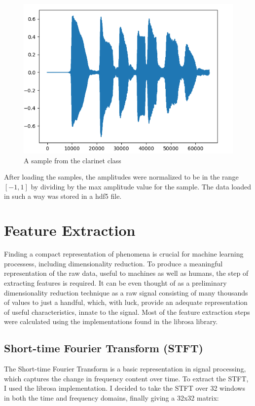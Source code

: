 \documentclass[a4paper, 12pt, twoside]{report}
\begin{document}
\begin{figure}[h!]
\centering
\includegraphics[width=.7\textwidth]{./Figures/original_sample.png}
\caption{\label{fig:example-fig}A sample from the clarinet class}
\end{figure}

After loading the samples, the amplitudes were normalized to be in the range \([-1, 1]\) by dividing by the max amplitude value for the sample. The data loaded in such a way was stored in a hdf5 file.

\section{Feature Extraction}
\label{sec:org8d85bd5}

Finding a compact representation of phenomena is crucial for machine learning processess, including dimensionality reduction. To produce a meaningful representation of the raw data, useful to machines as well as humans, the step of extracting features is required. It can be even thought of as a preliminary dimensionality reduction technique as a raw signal consisting of many thousands of values to just a handful, which, with luck, provide an adequate representation of useful characteristics, innate to the signal. Most of the feature extraction steps were calculated using the implementations found in the librosa library.


\subsection{Short-time Fourier Transform (STFT)}
\label{sec:org0c9e9c5}

The Short-time Fourier Transform is a basic representation in signal processing, which captures the change in frequency content over time.
To extract the STFT, I used the librosa implementation. I decided to take the STFT over 32 windows in both the time and frequency domains, finally giving a 32x32 matrix:
\end{document}
